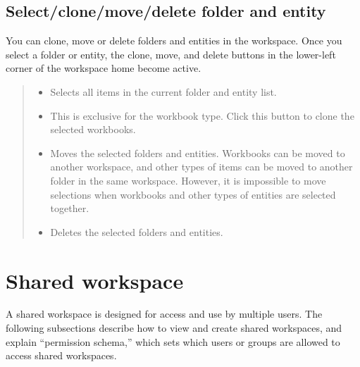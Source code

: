 \documentclass[letterpaper,10pt,english]{sphinxmanual}
\begin{document}
\subsection{Select/clone/move/delete folder and entity}
\label{\detokenize{discovery/part03/workspace_management:actions}}\label{\detokenize{discovery/part03/workspace_management:id5}}
You can clone, move or delete folders and entities in the workspace. Once you select a folder or entity, the clone, move, and delete buttons in the lower-left corner of the workspace home become active.
\begin{quote}

\begin{figure}[H]
\centering

\noindent{}
\end{figure}
\begin{itemize}
\item {} 
 Selects all items in the current folder and entity list.

\item {} 
 This is exclusive for the workbook type. Click this button to clone the selected workbooks.

\item {} 
 Moves the selected folders and entities. Workbooks can be moved to another workspace, and other types of items can be moved to another folder in the same workspace. However, it is impossible to move selections when workbooks and other types of entities are selected together.

\item {} 
 Deletes the selected folders and entities.

\end{itemize}
\end{quote}


\section{Shared workspace}
\label{\detokenize{discovery/part03/shared_workspace:id1}}\label{\detokenize{discovery/part03/shared_workspace::doc}}
A shared workspace is designed for access and use by multiple users. The following subsections describe how to view and create shared workspaces, and explain “permission schema,” which sets which users or groups are allowed to access shared workspaces.
\end{document}
